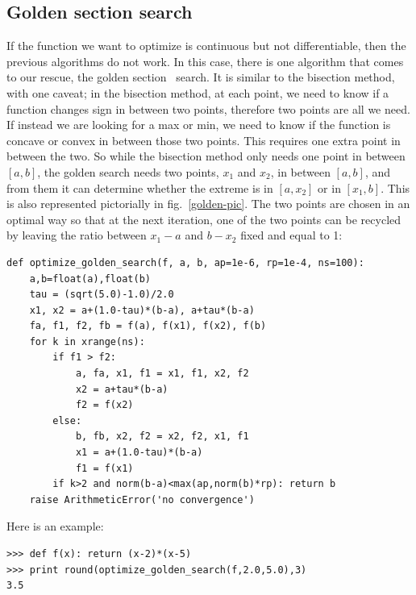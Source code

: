 \documentclass[justified,sixbynine]{tufte-book}
\def\ft{\small\tt}
\theoremstyle{plain}%
\theoremstyle{definition}
\theoremstyle{remark}
\begin{document}
\begin{fullwidth}
\goodbreak\subsection{Golden section search}


If the function we want to optimize is continuous but not differentiable, then the previous algorithms do not work. In this case, there is one algorithm that comes to our rescue, the golden section~\cite{golden} search. It is similar to the bisection method, with one caveat; in the bisection method, at each point, we need to know if a function changes sign in between two points, therefore two points are all we need. If instead we are looking for a max or min, we need to know if the function is concave or convex in between those two points. This requires one extra point in between the two. So while the bisection method only needs one point in between $[a,b]$, the golden search needs two points, $x_1$ and $x_2$, in between $[a,b]$, and from them it can determine whether the extreme is in $[a,x_2]$ or in $[x_1,b]$. This is also represented pictorially in fig.~\ref{golden-pic}. The two points are chosen in an optimal way so that at the next iteration, one of the two points can be recycled by leaving the ratio between $x_1-a$ and $b-x_2$ fixed and equal to 1:

\begin{lstlisting}[caption={in file: {\ft nlib.py}}]
def optimize_golden_search(f, a, b, ap=1e-6, rp=1e-4, ns=100):
    a,b=float(a),float(b)
    tau = (sqrt(5.0)-1.0)/2.0
    x1, x2 = a+(1.0-tau)*(b-a), a+tau*(b-a)
    fa, f1, f2, fb = f(a), f(x1), f(x2), f(b)
    for k in xrange(ns):
        if f1 > f2:
            a, fa, x1, f1 = x1, f1, x2, f2
            x2 = a+tau*(b-a)
            f2 = f(x2)
        else:
            b, fb, x2, f2 = x2, f2, x1, f1
            x1 = a+(1.0-tau)*(b-a)
            f1 = f(x1)
        if k>2 and norm(b-a)<max(ap,norm(b)*rp): return b
    raise ArithmeticError('no convergence')
\end{lstlisting}

Here is an example:

\begin{lstlisting}[caption={in file: {\ft nlib.py}}]
>>> def f(x): return (x-2)*(x-5)
>>> print round(optimize_golden_search(f,2.0,5.0),3)
3.5
\end{lstlisting}


\end{fullwidth}
\end{document}
